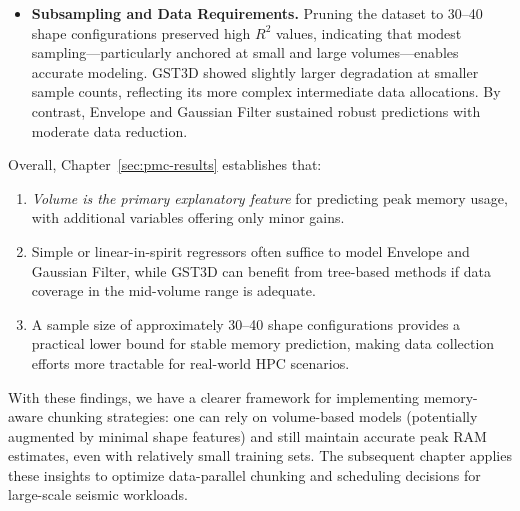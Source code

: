 \begin{itemize}
    \item \textbf{Subsampling and Data Requirements.}
    Pruning the dataset to 30–40 shape configurations preserved high $R^2$ values, indicating that modest sampling—particularly anchored at small and large volumes—enables accurate modeling.
    \ac{GST3D} showed slightly larger degradation at smaller sample counts, reflecting its more complex intermediate data allocations.
    By contrast, Envelope and Gaussian Filter sustained robust predictions with moderate data reduction.
\end{itemize}

Overall, Chapter~\ref{sec:pmc-results} establishes that:
\begin{enumerate}
    \item \emph{Volume is the primary explanatory feature} for predicting peak memory usage, with additional variables offering only minor gains.
    \item Simple or linear-in-spirit regressors often suffice to model Envelope and Gaussian Filter, while \ac{GST3D} can benefit from tree-based methods if data coverage in the mid-volume range is adequate.
    \item A sample size of approximately 30–40 shape configurations provides a practical lower bound for stable memory prediction, making data collection efforts more tractable for real-world \ac{HPC} scenarios.
\end{enumerate}

With these findings, we have a clearer framework for implementing memory-aware chunking strategies: one can rely on volume-based models (potentially augmented by minimal shape features) and still maintain accurate peak \ac{RAM} estimates, even with relatively small training sets.
The subsequent chapter applies these insights to optimize data-parallel chunking and scheduling decisions for large-scale seismic workloads.